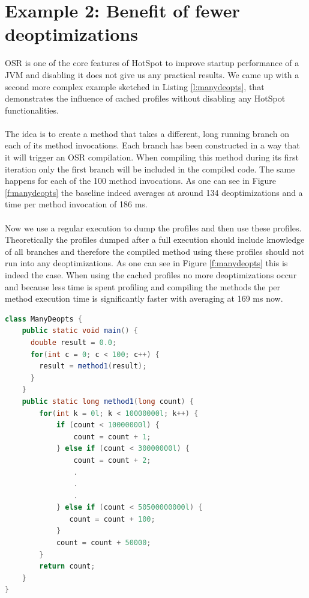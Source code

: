 \section{Example 2: Benefit of fewer deoptimizations}
\label{s:ex2}
OSR is one of the core features of HotSpot to improve startup performance of a JVM and disabling it does not give us any practical results. We came up with a second more complex example sketched in Listing \ref{l:manydeopts}, that demonstrates the influence of cached profiles without disabling any HotSpot functionalities.
\\\\
The idea is to create a method that takes a different, long running branch on each of its method invocations. Each branch has been constructed in a way that it will trigger an OSR compilation. When compiling this method during its first iteration only the first branch will be included in the compiled code. The same happens for each of the 100 method invocations. As one can see in Figure \ref{f:manydeopts} the baseline indeed averages at around 134 deoptimizations and a time per method invocation of 186 ms.
\\\\
Now we use a regular execution to dump the profiles and then use these profiles. Theoretically the profiles dumped after a full execution should include knowledge of all branches and therefore the compiled method using these profiles should not run into any deoptimizations. As one can see in Figure \ref{f:manydeopts} this is indeed the case. When using the cached profiles no more deoptimizations occur and because less time is spent profiling and compiling the methods the per method execution time is significantly faster with averaging at 169 ms now.
\begin{lstlisting}[float,caption=Simple method that causes many deoptimizations,label=l:manydeopts,language=Java]
class ManyDeopts {
    public static void main() {
      double result = 0.0;
      for(int c = 0; c < 100; c++) {
        result = method1(result);
      }
    }
    public static long method1(long count) {
        for(int k = 0l; k < 10000000l; k++) {
            if (count < 10000000l) {
                count = count + 1;
            } else if (count < 30000000l) {
                count = count + 2;
                .
                .
                .
            } else if (count < 50500000000l) {
               count = count + 100;
            }
            count = count + 50000;
        }
        return count;
    }
}
\end{lstlisting}
